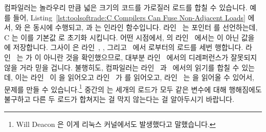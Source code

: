 {{{{\begin{lineref}
컴파일러는 놀라우리 만큼 넓은 크기의 코드를 가로질러 로드를 합칠 수 있습니다.
예를 들어,
Listing~\ref{lst:toolsoftrade:C Compilers Can Fuse Non-Adjacent Loads} 에서,
 와  은 동시에 수행되고,  과
 는 인라인 함수입니다.
라인~ 는 포인터  를 선언하는데, C 는 이를 기본값  로
초기화 시킵니다.
어떤 시점에서,  의 라인~ 에서는  이 아닌 값을
 에 저장합니다.
그사이  은 라인~, , 그리고~ 에서 
로부터의 로드를 세번 행합니다.
라인~ 는  가  이 아니란 것을 확인했으므로, 대부분
라인~ 에서의 디레퍼런스가 잘못되지 않을 거라 믿을 겁니다.
불행히도, 컴파일러는 라인~ 과~ 에서의 읽기를 합칠 수
있는데, 이는 라인~ 이  을 읽어오고 라인~ 가
 를 읽어오고, 라인~ 는  을 읽어올 수 있어서,
문제를 만들 수 있습니다.\footnote{
	Will Deacon 은 이게 리눅스 커널에서도 발생했다고 말했습니다.}
중간의  는 세개의 로드가 모두 같은 변수에 대해 행해짐에도
불구하고 다른 두 로드가 합쳐지는 걸 막지 않는다는 걸 알아두시기 바랍니다.

\end{lineref}

}}}}
